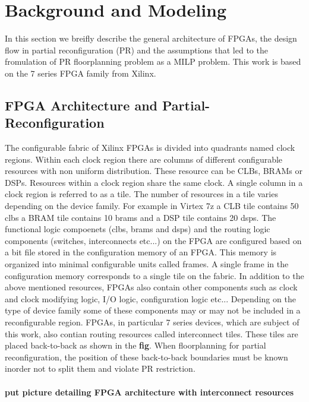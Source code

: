 \section{Background and Modeling}
In this section we breifly describe the general architecture of FPGAs, the design flow in partial reconfiguration (PR) and the assumptions that led to the fromulation of PR floorplanning problem as a MILP problem. This work is based on the 7 series FPGA family from Xilinx. \\

\subsection{FPGA Architecture and Partial-Reconfiguration}

The configurable fabric of Xilinx FPGAs is divided into quadrants named clock regions. Within each clock region there are columns of different configurable resources with non uniform distribution. These resource can be CLBs, BRAMs or DSPs.  Resources within a clock region share the same clock. A single column in a clock region is referred to as a tile. The number of resources in a tile varies depending on the device family. For example in Virtex 7z a CLB tile contains 50 clbs a BRAM tile contains 10 brams and a DSP tile contains 20 dsps. The functional logic compoenets (clbs, brams and dsps) and the routing logic components (switches, interconnects etc...) on the FPGA are configured based on a bit file stored in the configuration memory of an FPGA. This memory is organized into minimal configurable units called frames. A single frame in the configuration memory corresponds to a single tile on the fabric. In addition to the above mentioned resources, FPGAs also contain other components such as clock and clock modifying logic, I/O logic, configuration logic etc... Depending on the type of device family some of these components may or may not be included in a reconfigurable region. FPGAs, in particular 7 series devices, which are subject of this work, also contian routing resources called interconnect tiles. These tiles are placed back-to-back as shown in the \textbf{fig}. When floorplanning for partial reconfiguration, the position of these back-to-back boundaries must be known inorder not to split them and violate PR restriction. 
\\

\textbf{\\put picture detailing FPGA architecture with interconnect resources} \\

